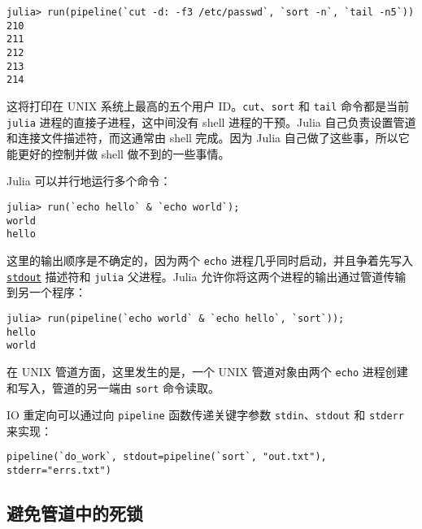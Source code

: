 \begin{verbatim}
julia> run(pipeline(`cut -d: -f3 /etc/passwd`, `sort -n`, `tail -n5`))
210
211
212
213
214
\end{verbatim}



这将打印在 UNIX 系统上最高的五个用户 ID。\texttt{cut}、\texttt{sort} 和 \texttt{tail} 命令都是当前 \texttt{julia} 进程的直接子进程，这中间没有 shell 进程的干预。Julia 自己负责设置管道和连接文件描述符，而这通常由 shell 完成。因为 Julia 自己做了这些事，所以它能更好的控制并做 shell 做不到的一些事情。



Julia 可以并行地运行多个命令：




\begin{verbatim}
julia> run(`echo hello` & `echo world`);
world
hello
\end{verbatim}



这里的输出顺序是不确定的，因为两个 \texttt{echo} 进程几乎同时启动，并且争着先写入 \hyperlink{18181294266083891471}{\texttt{stdout}} 描述符和 \texttt{julia} 父进程。Julia 允许你将这两个进程的输出通过管道传输到另一个程序：




\begin{verbatim}
julia> run(pipeline(`echo world` & `echo hello`, `sort`));
hello
world
\end{verbatim}



在 UNIX 管道方面，这里发生的是，一个 UNIX 管道对象由两个 \texttt{echo} 进程创建和写入，管道的另一端由 \texttt{sort} 命令读取。



IO 重定向可以通过向 \texttt{pipeline} 函数传递关键字参数 \texttt{stdin}、\texttt{stdout} 和 \texttt{stderr} 来实现：




\begin{verbatim}
pipeline(`do_work`, stdout=pipeline(`sort`, "out.txt"), stderr="errs.txt")
\end{verbatim}



\hypertarget{10119727931012697003}{}


\subsection{避免管道中的死锁}



